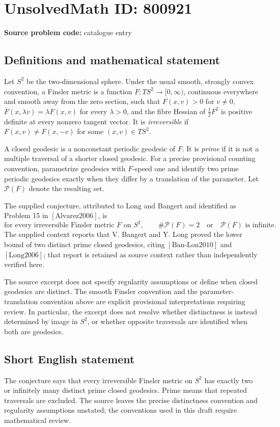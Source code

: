 \documentclass[11pt]{article}
\begin{document}
\section*{UnsolvedMath ID: 800921}
\textbf{Source problem code:} catalogue entry
\subsection{Definitions and mathematical statement}
Let \(S^2\) be the two-dimensional sphere. Under the usual smooth, strongly convex convention, a Finsler metric is a function \(F:TS^2\to[0,\infty)\), continuous everywhere and smooth away from the zero section, such that \(F(x,v)>0\) for \(v\ne0\), \(F(x,\lambda v)=\lambda F(x,v)\) for every \(\lambda>0\), and the fibre Hessian of \(\tfrac12F^2\) is positive definite at every nonzero tangent vector. It is \emph{irreversible} if \(F(x,v)\ne F(x,-v)\) for some \((x,v)\in TS^2\).

A closed geodesic is a nonconstant periodic geodesic of \(F\). It is \emph{prime} if it is not a multiple traversal of a shorter closed geodesic. For a precise provisional counting convention, parametrize geodesics with \(F\)-speed one and identify two prime periodic geodesics exactly when they differ by a translation of the parameter. Let \(\mathcal P(F)\) denote the resulting set.

The supplied conjecture, attributed to Long and Bangert and identified as Problem 15 in \([\mathrm{Alvarez2006}]\), is
\[
\text{for every irreversible Finsler metric }F\text{ on }S^2,
\qquad
\#\mathcal P(F)=2\quad\text{or}\quad\mathcal P(F)\text{ is infinite}.
\]
The supplied context reports that V. Bangert and Y. Long proved the lower bound of two distinct prime closed geodesics, citing \([\mathrm{Ban\text{-}Lon2010}]\) and \([\mathrm{Long2006}]\); that report is retained as source context rather than independently verified here.

The source excerpt does not specify regularity assumptions or define when closed geodesics are distinct. The smooth Finsler convention and the parameter-translation convention above are explicit provisional interpretations requiring review. In particular, the excerpt does not resolve whether distinctness is instead determined by image in \(S^2\), or whether opposite traversals are identified when both are geodesics.
\subsection{Short English statement}
The conjecture says that every irreversible Finsler metric on \(S^2\) has exactly two or infinitely many distinct prime closed geodesics. Prime means that repeated traversals are excluded. The source leaves the precise distinctness convention and regularity assumptions unstated; the conventions used in this draft require mathematical review.
\end{document}
